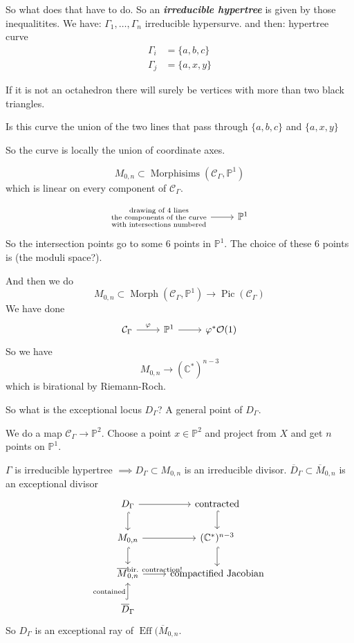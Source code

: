 So what does that have to do. So an \textit{\textbf{irreducible hypertree}} is given by those inequalitites. We have: $\Gamma_1,\ldots,\Gamma_n$ irreducible hypersurve. and then: hypertree curve
\begin{align*}
	\Gamma_i&=\{a,b,c\}\\
	 \Gamma_j&=\{a,x,y\}
\end{align*}

If it is not an octahedron there will surely be vertices with more than two black triangles.

\begin{question}
	Is this curve the union of the two lines that pass through $\{a,b,c\}$ and $\{a,x,y\}$
\end{question}

So the curve is locally the union of coordinate axes.

\[M_{0,n}\subset \operatorname{Morphisims}(\mathcal{C}_{\Gamma},\mathbb{P}^1)\]
which is linear on every component of $\mathcal{C}_{\Gamma}$.

\[\begin{tikzcd}
	\substack{\text{drawing of 4 lines}  \\\text{the components of the curve}\\\text{with intersections numbered}   }\arrow[r]&\mathbb{P}^1
\end{tikzcd}\]
So the intersection points go to some 6 points in $\mathbb{P}^1$. The choice of these 6 points is (the moduli space?).

And then we do
\[M_{0,n}\subset \operatorname{Morph}(\mathcal{C}_{\Gamma},\mathbb{P}^1)\to \operatorname{Pic}(\mathcal{C}_{\Gamma})\]
We have done
\[\begin{tikzcd}
	\mathcal{C}_{\Gamma}\arrow[r,"\varphi"]&\mathbb{P}^1\arrow[r]&\varphi^*\mathcal{O}(1)
\end{tikzcd}\]
So we have
\[M_{0,n}\longrightarrow(\mathbb{C}^* )^{n-3}\]
which is birational by Riemann-Roch.

So what is the exceptional locus $D_\Gamma$? A general point of $D_\Gamma$.

We do a map $\mathcal{C}_{\Gamma}\to  \mathbb{P}^2$. Choose a point $x\in\mathbb{P}^2$ and project from $X$ and get $n$ points on $\mathbb{P}^1$.

\begin{thm}\leavevmode
	$\Gamma$ is irreducible hypertree $\implies D_{\Gamma}\subset M_{0,n}$ is an irreducible divisor. $\overline{D}_{\Gamma}\subset \overline{M}_{0,n}$ is an exceptional divisor
	\[\begin{tikzcd}
		D_{\Gamma}\arrow[r]\arrow[d,hook]&\text{contracted} \arrow[d,hook]\\
		M_{0,n}\arrow[r]\arrow[d,hook]& (\mathbb{C}^*)^{n-3}\arrow[d,hook]\\
		\overline{M}_{0,n}\arrow[r, "\text{bir. contraction!}" ]&\text{compactified Jacobian} \\
		\overline{D}_{\Gamma}\arrow[u,hook,"\text{contained}" ]&\leavevmode 
	\end{tikzcd}\]
	So $D_\Gamma$ is an exceptional ray of $\operatorname{E f f}(\overline{M}_{0,n}$.
\end{thm}

